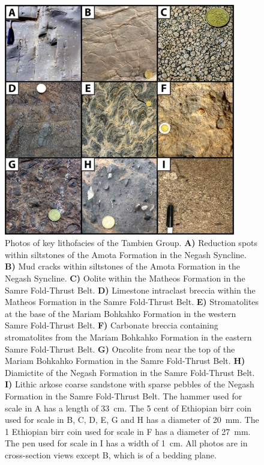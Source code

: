 \begin{figure}[!htbp]
\begin{center}
	\includegraphics[width=0.9\textwidth]{figures/Tambien/lithofacies.jpg}
	\caption[Photos of key lithofacies of the Tambien Group.]{Photos of key lithofacies of the Tambien Group. \textbf{A)} Reduction spots within siltstones of the Amota Formation in the Negash Syncline. \textbf{B)} Mud cracks within siltstones of the Amota Formation in the Negash Syncline. \textbf{C)} Oolite within the Matheos Formation in the Samre Fold-Thrust Belt. \textbf{D)} Limestone intraclast breccia within the Matheos Formation in the Samre Fold-Thrust Belt. \textbf{E)} Stromatolites at the base of the Mariam Bohkahko Formation in the western Samre Fold-Thrust Belt. \textbf{F)} Carbonate breccia containing stromatolites from the Mariam Bohkahko Formation in the eastern Samre Fold-Thrust Belt. \textbf{G)} Oncolite from near the top of the Mariam Bohkahko Formation in the Samre Fold-Thrust Belt. \textbf{H)} Diamictite of the Negash Formation in the Samre Fold-Thrust Belt. \textbf{I)} Lithic arkose coarse sandstone with sparse pebbles of the Negash Formation in the Samre Fold-Thrust Belt. The hammer used for scale in A has a length of 33~cm. The 5 cent of Ethiopian birr coin used for scale in B, C, D, E, G and H has a diameter of 20~mm. The 1 Ethiopian birr coin used for scale in F has a diameter of 27~mm. The pen used for scale in I has a width of 1~cm. All photos are in cross-section views except B, which is of a bedding plane.}
	\label{fig:lithofacies}
\end{center}
\end{figure}

